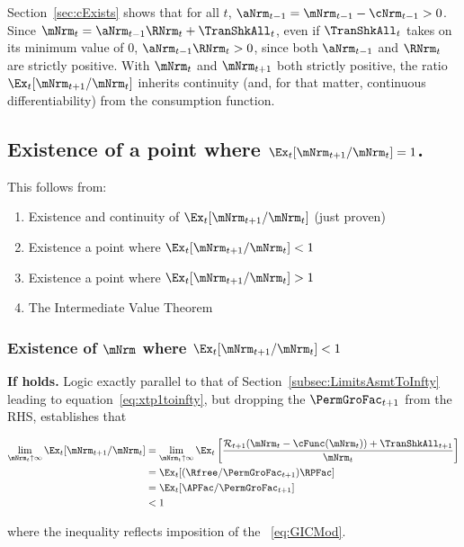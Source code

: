 \documentclass[\econtexRoot/BufferStockTheory]{subfiles}
\begin{document}
Section~\ref{sec:cExists} shows that for all $t$, $\aNrm_{t-1} = {\mNrm}_{t-1} -  \cNrm_{t-1} > 0$.  Since ${\mNrm}_{t}= {\aNrm}_{t-1} \RNrm_{t} + \TranShkAll_{t}$, even if $\TranShkAll_{t}$ takes on its minimum value of 0, $\aNrm_{t-1} \RNrm_{t} > 0$, since both $\aNrm_{t-1}$ and $\RNrm_{t}$ are strictly positive.  With $\mNrm_{t}$ and $\mNrm_{t+1}$ both strictly positive, the ratio $\Ex_t [{\mNrm}_{t+1}/\mNrm_t]$ inherits continuity (and, for that matter, continuous differentiability) from the consumption function.

\subsection{Existence of a point where
  \texorpdfstring{$\Ex_t [{\mNrm}_{t+1}/\mNrm_t]=1$}
  {Ex-t[mNrm-{t+1}/mNrm-{t}]=1}.}

This follows from:
\begin{enumerate}
\item Existence and continuity of $\Ex_t [{\mNrm}_{t+1}/\mNrm_t]$ (just proven)
  \item Existence a point where $\Ex_t [{\mNrm}_{t+1}/\mNrm_t] < 1$
  \item Existence a point where $\Ex_t [{\mNrm}_{t+1}/\mNrm_t] > 1$
    \item The Intermediate Value Theorem
    \end{enumerate}

\subsubsection{Existence of \texorpdfstring{$\mNrm$}{m} where \texorpdfstring{$\Ex_t [{\mNrm}_{t+1}/\mNrm_t] < 1$}{E[m{t+1}/m{t}}}
    
\textbf{If {\RIC} holds.}  Logic exactly parallel to that of Section~\ref{subsec:LimitsAsmtToInfty} leading to equation~\eqref{eq:xtp1toinfty}, but dropping the $\PermGroFac_{t+1}$ from the RHS, establishes that
\begin{samepage}
\begin{equation}\begin{gathered}\begin{aligned}
  \lim_{\mNrm_{t} \uparrow \infty} \Ex_{t}[{\mNrm}_{t+1}/\mNrm_{t}]  & =   
                                                                       \lim_{\mNrm_{t} \uparrow \infty} 
                                                                       \Ex_{t}\left[\frac{{\mathcal{\mathcal{R}}}_{t+1}(\mNrm_{t}-\cFunc(\mNrm_{t}))+{\TranShkAll}_{t+1}}{\mNrm_{t}}\right] \notag 
  \\  & = \Ex_{t}[(\Rfree/{\PermGroFac}_{t+1})\RPFac]  \notag
  \\  & = \Ex_{t}[{\APFac}/{\PermGroFac}_{t+1}]  \label{eq:emgro}
  \\  & < 1 \notag
\end{aligned}\end{gathered}\end{equation}
\end{samepage}
where the inequality reflects imposition of the \GICMod~\eqref{eq:GICMod}.
\end{document}
